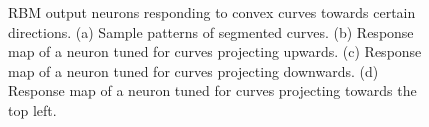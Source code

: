 \documentclass[conference]{IEEEtran}
\begin{document}
\begin{figure}[htp]
\centering
{}\hfil
{}\hfil
{}\hfil
{}
\caption{RBM output neurons responding to convex curves towards certain directions.
(a) Sample patterns of segmented curves.
(b) Response map of a neuron tuned for curves projecting upwards.
(c) Response map of a neuron tuned for curves projecting downwards.
(d) Response map of a neuron tuned for curves projecting towards the top left.}
\label{fig:7}
\end{figure}
\end{document}
